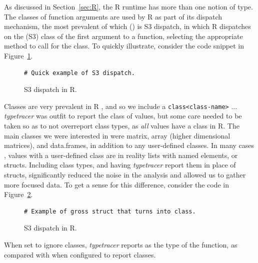 \documentclass[acmsmall,review,anonymous]{acmart}\settopmatter{printfolios=true,printccs=false,printacmref=false}
\newcommand{\code}[1]{{\lstinline[style=Rin]!#1!}\xspace}
\newcommand{\typetracer}{\emph{typetracer}\xspace} %
\begin{document}
As discussed in Section~\ref{sec:R}, the R runtime has more than one notion of type.  
The classes of function arguments are used by R as part of its dispatch mechanism, the most prevalent of which () is S3 dispatch, in which R dispatches on the (S3) class of the first argument to a function, selecting the appropriate method to call for the class.
To quickly illustrate, consider the code snippet in Figure~\ref{fig:dispatch-ex}.

\begin{figure}[htbp]
\begin{center}

\begin{lstlisting}
# Quick example of S3 dispatch.
\end{lstlisting}

\caption{S3 dispatch in R.}
\label{fig:dispatch-ex}
\end{center}
\end{figure}

Classes are very prevalent in R , and so we include a \code{class<class-name>} ... 
\typetracer was outfit to report the class of values, but some care needed to be taken so as to not overreport class types, as {\it all} values have a class in R.
The main classes we were interested in were matrix, array (higher dimensional matrices), and data.frames, in addition to any user-defined classes.
In many cases , values with a user-defined class are in reality lists with named elements, or structs.
Including class types, and having \typetracer report them in place of structs, significantly reduced the noise in the analysis and allowed us to gather more focused data.
To get a sense for this difference, consider the code in Figure~\ref{fig:class-vs-struct}.

\begin{figure}[htbp]
\begin{center}

\begin{lstlisting}
# Example of gross struct that turns into class.
\end{lstlisting}

\caption{S3 dispatch in R.}
\label{fig:class-vs-struct}
\end{center}
\end{figure}

When set to ignore classes, \typetracer reports  as the type of the function, as compared with  when configured to report classes.
\end{document}
